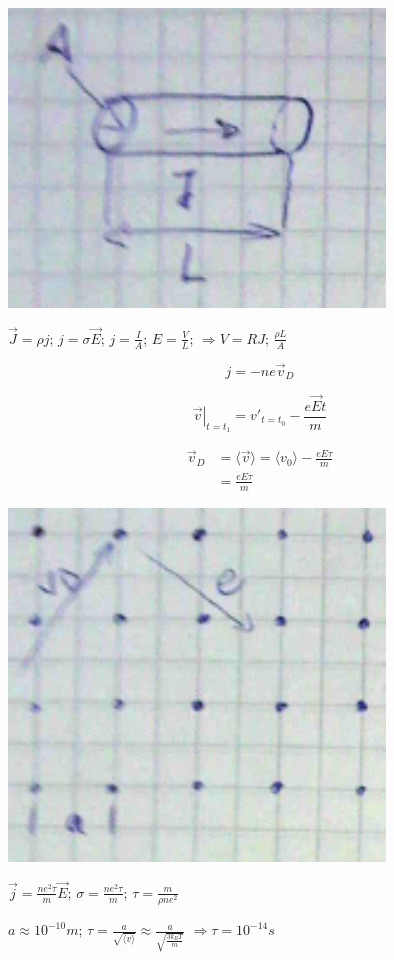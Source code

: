 \includegraphics[width=0.75\textwidth]{kap06_17.png}

\(\vec J=\rho j\); \(j=\sigma\vec E\); \(j=\frac{I}{A}\); \(E=\frac{V}{L}\); \(\Rightarrow V=RJ\); \( \frac{\rho L}{A}\)

\[ j = -ne\vec v_D\]

\[\left. \vec v\right|_{t=t_1}=v'_{t=t_0}-\frac{e\vec E t}{m} \]

\begin{align}
\vec v_D &= \langle \vec v \rangle  = \langle v_0\rangle -\frac{eE\tau}{m} \\
&=\frac{eE\tau}{m}
\end{align}


\includegraphics[width=0.75\textwidth]{kap06_18.png}

\(\vec j = \frac{ne^2\tau}{m}\vec E\); \(\sigma = \frac{ne^2\tau}{m}\); \(\tau = \frac{m}{\rho n e^2}\)


\(a\approx 10^{-10}m\); \(\tau = \frac{a}{\sqrt{\langle v\rangle }}\approx \frac{a}{\sqrt{\frac{3k_BT}{m}}}\)
\(\Rightarrow \tau = 10^{-14}s\)

